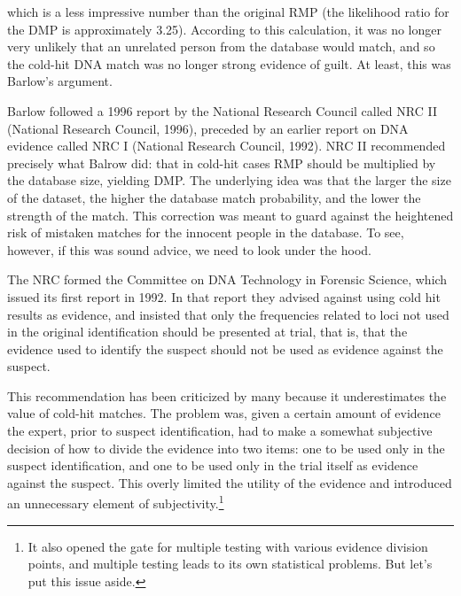 \documentclass[
  10pt,
  dvipsnames,enabledeprecatedfontcommands]{scrartcl}
\begin{document}
\noindent which is a less impressive number than the original RMP (the
likelihood ratio for the DMP is approximately 3.25). According to this
calculation, it was no longer very unlikely that an unrelated person
from the database would match, and so the cold-hit DNA match was no
longer strong evidence of guilt. At least, this was Barlow's argument.

Barlow followed a 1996 report by the National Research Council called
NRC II (National Research Council, 1996), preceded by an earlier report
on DNA evidence called NRC I (National Research Council, 1992). NRC II
recommended precisely what Balrow did: that in cold-hit cases RMP should
be multiplied by the database size, yielding DMP. The underlying idea
was that the larger the size of the dataset, the higher the database
match probability, and the lower the strength of the match. This
correction was meant to guard against the heightened risk of mistaken
matches for the innocent people in the database. To see, however, if
this was sound advice, we need to look under the hood.

The NRC formed the Committee on DNA Technology in Forensic Science,
which issued its first report in 1992. In that report they advised
against using cold hit results as evidence, and insisted that only the
frequencies related to loci not used in the original identification
should be presented at trial, that is, that the evidence used to
identify the suspect should not be used as evidence against the suspect.

This recommendation has been criticized by many because it
underestimates the value of cold-hit matches. The problem was, given a
certain amount of evidence the expert, prior to suspect identification,
had to make a somewhat subjective decision of how to divide the evidence
into two items: one to be used only in the suspect identification, and
one to be used only in the trial itself as evidence against the suspect.
This overly limited the utility of the evidence and introduced an
unnecessary element of
subjectivity.\footnote{It also opened the gate for multiple testing with various evidence division points, and multiple testing leads to its own statistical problems. But let's put this issue aside.}
\end{document}
